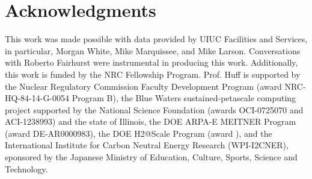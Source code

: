 \section{Acknowledgments}

This work was made possible with data provided by UIUC Facilities and Services, 
in particular, Morgan White, Mike Marquissee, and Mike Larson. Conversations with 
Roberto Fairhurst were instrumental in producing this work. Additionally, 
this work is funded by the NRC Fellowship Program. Prof. Huff is supported by 
the Nuclear Regulatory Commission Faculty
Development Program (award NRC-HQ-84-14-G-0054 Program B), the Blue Waters
sustained-petascale computing project supported by the National Science
Foundation (awards OCI-0725070 and ACI-1238993) and the state of Illinois,
the DOE ARPA-E MEITNER Program (award DE-AR0000983), the DOE H2@Scale
Program (award ), and the International Institute for Carbon Neutral Energy
Research (WPI-I2CNER), sponsored by the Japanese Ministry of Education,
Culture, Sports, Science and Technology.
